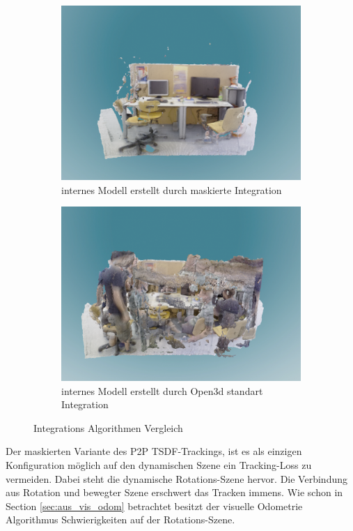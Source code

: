 \documentclass[12pt,DIV=15,BCOR=15mm,twoside,headsepline,abstract=true,listof=totoc,bibliography=totoc]{scrreprt}
\theoremstyle{remark}    %
\begin{document}
\begin{figure}[ht]
        \begin{subfigure}[t]{0.45\textwidth}
            \centering
            \includegraphics[width=\textwidth]{pics/maskout.png}
            \caption{internes Modell erstellt durch maskierte Integration}
            \label{fig:recon_mask}
        \end{subfigure}
        \hfill
        \begin{subfigure}[t]{0.45\textwidth}
            \centering
            \includegraphics[width=\textwidth]{pics/raw.png}
            \caption{internes Modell erstellt durch Open3d standart Integration}
            \label{fig:recon_raw}
        \end{subfigure}
        \caption{Integrations Algorithmen Vergleich}
        \label{fig:bilder_nebeneinander}
    \end{figure}
    Der maskierten Variante des \ac{P2P} \ac{TSDF}-Trackings, ist es als einzigen Konfiguration möglich auf den dynamischen Szene ein Tracking-Loss zu vermeiden. 
    Dabei steht die dynamische Rotations-Szene hervor. Die Verbindung aus Rotation und bewegter Szene erschwert das Tracken immens.
    Wie schon in Section \ref{sec:aus_vis_odom} betrachtet besitzt der visuelle Odometrie Algorithmus Schwierigkeiten auf der Rotations-Szene.
\end{document}
